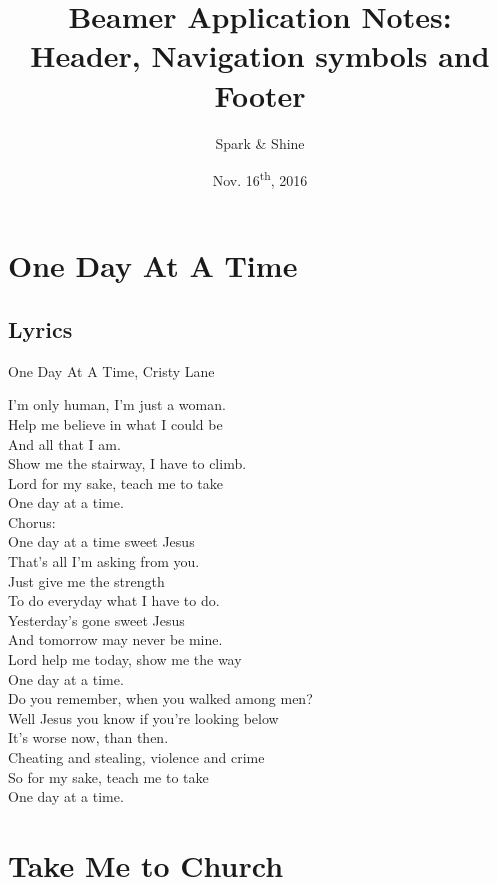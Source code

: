 \documentclass[compress]{beamer}
\title[Header, Navigation symbols and Footer]{Beamer Application Notes: Header, Navigation symbols and Footer}
\author[Spark \& Shine]{
Spark \& Shine
}
\institute{
http://sparkandshine.net\\
}
\date[Nov. 16]{Nov. 16\textsuperscript{th}, 2016}
\begin{document}
\begin{frame}[noframenumbering]%
	\titlepage
\end{frame}

\section{One Day At A Time}
\subsection{Lyrics}
\begin{frame}[allowframebreaks]{One Day At A Time, Cristy Lane}
\begin{center}
I'm only human, I'm just a woman. \\
Help me believe in what I could be \\
And all that I am. \\
Show me the stairway, I have to climb. \\
Lord for my sake, teach me to take \\
One day at a time. \\

Chorus: \\
One day at a time sweet Jesus\\ 
That's all I'm asking from you. \\
Just give me the strength \\
To do everyday what I have to do. \\
Yesterday's gone sweet Jesus \\
And tomorrow may never be mine. \\
Lord help me today, show me the way \\
One day at a time. \\

Do you remember, when you walked among men? \\
Well Jesus you know if you're looking below \\
It's worse now, than then. \\
Cheating and stealing, violence and crime \\
So for my sake, teach me to take \\
One day at a time. \\
\end{center}
\end{frame}

\section{Take Me to Church}
\end{document}
